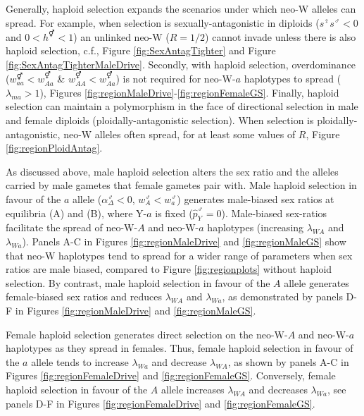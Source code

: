 \documentclass[12pt]{article}
\begin{document}
Generally, haploid selection expands the scenarios under which neo-W alleles can spread. 
For example, when selection is sexually-antagonistic in diploids ($s^\female s^\male <0$ and $0<h^\Hermaphrodite<1$) an unlinked neo-W ($R=1/2$) cannot invade unless there is also haploid selection, c.f., Figure \ref{fig:SexAntagTighter} and Figure \ref{fig:SexAntagTighterMaleDrive}. 
Secondly, with haploid selection, overdominance ($w_{aa}^\Hermaphrodite<w_{Aa}^\Hermaphrodite$ \& $w_{AA}^\Hermaphrodite<w_{Aa}^\Hermaphrodite$) is not required for neo-W-$a$ haplotypes to spread ($\lambda_{ma}>1$), Figures \ref{fig:regionMaleDrive}-\ref{fig:regionFemaleGS}. 
Finally, haploid selection can maintain a polymorphism in the face of directional selection in male and female diploids (ploidally-antagonistic selection). 
When selection is ploidally-antagonistic, neo-W alleles often spread, for at least some values of $R$, Figure \ref{fig:regionPloidAntag}. 

As discussed above, male haploid selection alters the sex ratio and the alleles carried by male gametes that female gametes pair with. 
Male haploid selection in favour of the $a$ allele ($\alpha_{\Delta}^\male<0$, $w_{A}^\male<w_{a}^\male$) generates male-biased sex ratios at equilibria (A) and (B), where Y-$a$ is fixed ($\hat{p}_{Y}^\male=0$). 
Male-biased sex-ratios facilitate the spread of neo-W-$A$ and neo-W-$a$ haplotypes (increasing $\lambda_{WA}$ and $\lambda_{Wa}$). 
Panels A-C in Figures \ref{fig:regionMaleDrive} and \ref{fig:regionMaleGS} show that neo-W haplotypes tend to spread for a wider range of parameters when sex ratios are male biased, compared to Figure \ref{fig:regionplots} without haploid selection. 
By contrast, male haploid selection in favour of the $A$ allele generates female-biased sex ratios and reduces $\lambda_{WA}$ and $\lambda_{Wa}$, as demonstrated by panels D-F in Figures \ref{fig:regionMaleDrive} and \ref{fig:regionMaleGS}. 

Female haploid selection generates direct selection on the neo-W-$A$ and neo-W-$a$ haplotypes as they spread in females. 
Thus, female haploid selection in favour of the $a$ allele tends to increase $\lambda_{Wa}$ and decrease $\lambda_{WA}$, as shown by panels A-C in Figures \ref{fig:regionFemaleDrive} and \ref{fig:regionFemaleGS}. 
Conversely, female haploid selection in favour of the $A$ allele increases $\lambda_{WA}$ and decreases $\lambda_{Wa}$, see panels D-F in Figures \ref{fig:regionFemaleDrive} and \ref{fig:regionFemaleGS}. 

\end{document}
